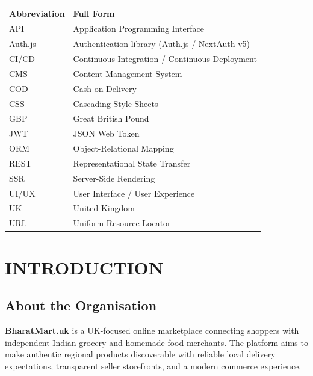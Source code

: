 \documentclass[12pt,a4paper]{report}
\begin{document}
\begin{center}
\renewcommand{\arraystretch}{1.5}
\begin{tabular}{|p{3.5cm}|p{9.0cm}|}
    \hline
    \textbf{Abbreviation} & \textbf{Full Form} \\
    \hline
    API     & Application Programming Interface \\
    \hline
    Auth.js & Authentication library (Auth.js / NextAuth v5) \\
    \hline
    CI/CD   & Continuous Integration / Continuous Deployment \\
    \hline
    CMS     & Content Management System \\
    \hline
    COD     & Cash on Delivery \\
    \hline
    CSS     & Cascading Style Sheets \\
    \hline
    GBP     & Great British Pound \\
    \hline
    JWT     & JSON Web Token \\
    \hline
    ORM     & Object-Relational Mapping \\
    \hline
    REST    & Representational State Transfer \\
    \hline
    SSR     & Server-Side Rendering \\
    \hline
    UI/UX   & User Interface / User Experience \\
    \hline
    UK      & United Kingdom \\
    \hline
    URL     & Uniform Resource Locator \\
    \hline
\end{tabular}
\end{center}

\newpage

\chapter{INTRODUCTION}

\section{About the Organisation}

\textbf{BharatMart.uk} is a UK-focused online marketplace connecting shoppers
with independent Indian grocery and homemade-food merchants. The platform aims
to make authentic regional products discoverable with reliable local delivery
expectations, transparent seller storefronts, and a modern commerce experience.
\end{document}
